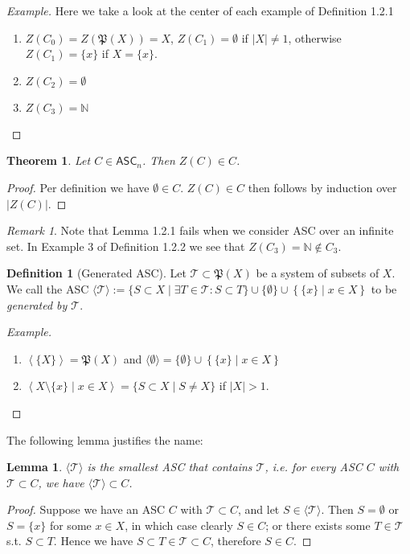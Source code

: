 \documentclass{article}
\newtheorem{theorem}{Theorem}[subsection]
\newtheorem{lemma}{Lemma}[subsection]
\theoremstyle{remark}
\newtheorem{remark}{Remark}[subsection]
\theoremstyle{definition}
\newtheorem{definition}{Definition}[subsection]
\newcommand{\N}{\mathbb N}
\newcommand{\p}{\mathfrak P}
\newcommand{\ASC}{\mathsf{ASC}}
\newenvironment{example}{\begin{proof}[Example]}{\end{proof}}
\begin{document}
	\begin{example}
		Here we take a look at the center of each example of Definition 1.2.1
		\begin{enumerate}
			\item $Z(C_0)=Z(\p(X))=X$, $Z(C_1)=\emptyset$ if $|X|\neq1$, otherwise $Z(C_1)=\{x\}$ if $X=\{x\}$.
			\item $Z(C_2)=\emptyset$
			\item $Z(C_3)=\N$
		\end{enumerate}
	\end{example}
	\begin{theorem}
		Let $C\in\ASC_n$. Then $Z(C)\in C$.
	\end{theorem}
	\begin{proof}
		Per definition we have $\emptyset\in C$. $Z(C)\in C$ then follows by induction over $|Z(C)|$.
	\end{proof}
	\begin{remark}
		Note that Lemma 1.2.1 fails when we consider ASC over an infinite set. In Example 3 of Definition 1.2.2 we see that $Z(C_3)=\N\notin C_3$.
	\end{remark}
	\begin{definition}[Generated ASC]
		Let $\mathcal T\subset\p(X)$ be a system of subsets of $X$. We call the ASC $\langle\mathcal T\rangle:=\{S\subset X\mid\exists T\in\mathcal T:S\subset T\}\cup\{\emptyset\}\cup\left\{\{x\}\mid x\in X\right\}$ to be \textit{generated by $\mathcal T$}.
	\end{definition}
	\begin{example}
		\begin{enumerate}
			\item $\left\langle\{X\}\right\rangle=\p(X)$ and $\langle\emptyset\rangle=\{\emptyset\}\cup\left\{\{x\}\mid x\in X\right\}$
			\item $\left\langle X\setminus\{x\}\mid x\in X\right\rangle=\{S\subset X\mid S\neq X\}$ if $|X|>1$.
		\end{enumerate}
	\end{example}
	The following lemma justifies the name:
	\begin{lemma}
		$\langle\mathcal T\rangle$ is the smallest ASC that contains $\mathcal T$, i.e. for every ASC $C$ with $\mathcal{T}\subset C$, we have $\langle\mathcal T\rangle\subset C$.
	\end{lemma}
	\begin{proof}
		Suppose we have an ASC $C$ with $\mathcal T\subset C$, and let $S\in\langle\mathcal{T}\rangle$. Then $S=\emptyset$ or $S=\{x\}$ for some $x\in X$, in which case clearly $S\in C$; or there exists some $T\in\mathcal{T}$ s.t. $S\subset T$. Hence we have $S\subset T\in\mathcal{T}\subset C$, therefore $S\in C$.
	\end{proof}
\end{document}

